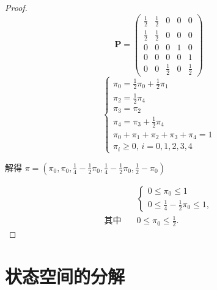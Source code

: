 \documentclass[lang=cn,10pt,thmcnt=section]{elegantbook}
\begin{document}
\begin{proof}
	\[
\mathbf{P} = \begin{pmatrix}
\frac{1}{2} & \frac{1}{2} & 0 & 0 & 0 \\
\frac{1}{2} & \frac{1}{2} & 0 & 0 & 0 \\
0 & 0 & 0 & 1 & 0 \\
0 & 0 & 0 & 0 & 1 \\
0 & 0 & \frac{1}{2} & 0 & \frac{1}{2}
\end{pmatrix}
\]
\[
\begin{cases}
\pi_0 = \frac{1}{2} \pi_0 + \frac{1}{2} \pi_1 \\
\pi_2 = \frac{1}{2} \pi_4 \\
\pi_3 = \pi_2 \\
\pi_4 = \pi_3 + \frac{1}{2} \pi_4 \\
\pi_0 + \pi_1 + \pi_2 + \pi_3 + \pi_4 = 1 \\
\pi_i \geq 0, \, i = 0, 1, 2, 3, 4
\end{cases}
\]

解得 $\pi = (\pi_0, \pi_0, \frac{1}{4} - \frac{1}{2} \pi_0, \frac{1}{4} - \frac{1}{2} \pi_0, \frac{1}{2} - \pi_0)$

\begin{align*}
	&\begin{cases}
	0 \leq \pi_0 \leq 1 \\
	0 \leq \frac{1}{4} - \frac{1}{2} \pi_0 \leq 1,
	\end{cases} \\
	\text{其中} \quad & 0 \leq \pi_0 \leq \frac{1}{2}.
	\end{align*}
\end{proof}
\section{状态空间的分解}
\end{document}
